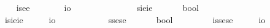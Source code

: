 \begin{isabellebody}
\ \ \isamarkupfalse%
\ isee\ {\isacharequal}\ \ \ \ \ \ \ {\isachardoublequoteopen}{\isacharparenleft}{\isasymzero}{\isasymRightarrow}{\isasymzero}{\isasymRightarrow}io{\isacharparenright}{\isachardoublequoteclose}\ \ \ \ \ \ \ \ \ \ \ {\isacharparenleft}{\isachardoublequoteopen}{\isasymup}{\isasymlangle}{\isasymzero}{\isacharcomma}{\isasymzero}{\isasymrangle}{\isachardoublequoteclose}{\isacharparenright}\isanewline
\ \ \isamarkupfalse%
\ sieie\ {\isacharequal}\ \ \ \ \ \ {\isachardoublequoteopen}{\isacharparenleft}{\isasymup}{\isasymzero}{\isasymRightarrow}{\isasymup}{\isasymzero}{\isasymRightarrow}bool{\isacharparenright}{\isachardoublequoteclose}\ \ \ \ \ \ \ {\isacharparenleft}{\isachardoublequoteopen}{\isasymlangle}{\isasymup}{\isasymzero}{\isacharcomma}{\isasymup}{\isasymzero}{\isasymrangle}{\isachardoublequoteclose}{\isacharparenright}\isanewline
\ \ \isamarkupfalse%
\ isieie\ {\isacharequal}\ \ \ \ \ {\isachardoublequoteopen}{\isacharparenleft}{\isasymup}{\isasymzero}{\isasymRightarrow}{\isasymup}{\isasymzero}{\isasymRightarrow}io{\isacharparenright}{\isachardoublequoteclose}\ \ \ \ \ \ \ \ {\isacharparenleft}{\isachardoublequoteopen}{\isasymup}{\isasymlangle}{\isasymup}{\isasymzero}{\isacharcomma}{\isasymup}{\isasymzero}{\isasymrangle}{\isachardoublequoteclose}{\isacharparenright}\isanewline
\ \ \isamarkupfalse%
\ ssese\ {\isacharequal}\ \ \ \ \ \ {\isachardoublequoteopen}{\isacharparenleft}{\isasymlangle}{\isasymzero}{\isasymrangle}{\isasymRightarrow}{\isasymlangle}{\isasymzero}{\isasymrangle}{\isasymRightarrow}bool{\isacharparenright}{\isachardoublequoteclose}\ \ \ \ \ {\isacharparenleft}{\isachardoublequoteopen}{\isasymlangle}{\isasymlangle}{\isasymzero}{\isasymrangle}{\isacharcomma}{\isasymlangle}{\isasymzero}{\isasymrangle}{\isasymrangle}{\isachardoublequoteclose}{\isacharparenright}\isanewline
\ \ \isamarkupfalse%
\ issese\ {\isacharequal}\ \ \ \ \ {\isachardoublequoteopen}{\isacharparenleft}{\isasymlangle}{\isasymzero}{\isasymrangle}{\isasymRightarrow}{\isasymlangle}{\isasymzero}{\isasymrangle}{\isasymRightarrow}io{\isacharparenright}{\isachardoublequoteclose}\ \ \ \ \ \ {\isacharparenleft}{\isachardoublequoteopen}{\isasymup}{\isasymlangle}{\isasymlangle}{\isasymzero}{\isasymrangle}{\isacharcomma}{\isasymlangle}{\isasymzero}{\isasymrangle}{\isasymrangle}{\isachardoublequoteclose}{\isacharparenright}\isanewline
\ \ \isamarkupfalse%

\end{isabellebody}
